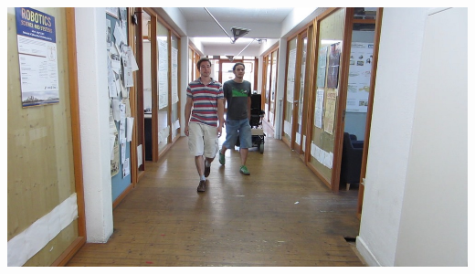 \documentclass{beamer}
\begin{document}
\begin{frame}
\begin{overprint}
    \includegraphics[width=\textwidth]{images/image-049.jpg}
  \end{overprint}
  \begin{spacing}{0.5}
    {\tiny\color{gray}}
  \end{spacing}
\end{frame}
\end{document}

